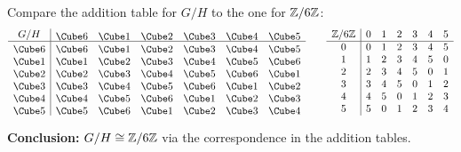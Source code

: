 \documentclass[../algebraNotesMSRI-UP2016.tex]{subfiles}
\begin{document}
\begin{frame}[c]
Compare the addition table for $G/H$ to the one for $\mathbb Z/6\mathbb Z$:
\[
\begin{array}{c | c c c c c c }
 G/H  & \die{6} & \die{1} & \die{2} & \die{3} & \die{4} & \die{5} \\
 \hline
 \die{6} & \die{6} & \die{1} & \die{2} & \die{3} & \die{4} & \die{5} \\ 
 \die{1} & \die{1} & \die{2} & \die{3} & \die{4} & \die{5} & \die{6} \\
 \die{2} & \die{2} & \die{3} & \die{4} & \die{5} & \die{6} & \die{1} \\
 \die{3} & \die{3} & \die{4} & \die{5} & \die{6} & \die{1} & \die{2} \\
 \die{4} & \die{4} & \die{5} & \die{6} & \die{1} & \die{2} & \die{3} \\
 \die{5} & \die{5} & \die{6} & \die{1} & \die{2} & \die{3} & \die{4}
\end{array}
\qquad
\begin{array}{c | c c c c c c }
 \Z/6\Z  & 0 & 1 & 2 & 3 & 4 & 5 \\
 \hline
 0 & 0 & 1 & 2 & 3 & 4 & 5 \\ 
 1 & 1 & 2 & 3 & 4 & 5 & 0 \\
 2 & 2 & 3 & 4 & 5 & 0 & 1 \\
 3 & 3 & 4 & 5 & 0 & 1 & 2 \\
 4 & 4 & 5 & 0 & 1 & 2 & 3 \\
 5 & 5 & 0 & 1 & 2 & 3 & 4
\end{array}
\]	

\smallGap
\textbf{Conclusion:} $G/H\cong \mathbb Z/6\mathbb Z$ via the correspondence in the addition tables.
\end{frame}
\end{document}
